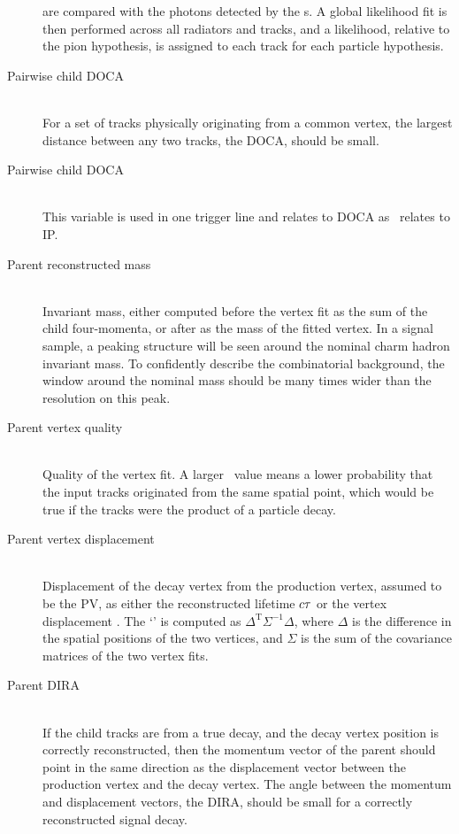 \begin{description}
    are compared with the photons detected by the {\rich}s.
    A global likelihood fit is then performed across all radiators and tracks, 
    and a likelihood, relative to the pion hypothesis, is assigned to each 
    track for each particle hypothesis.
  \item[Pairwise child \ac{DOCA}] \hfill \\
    For a set of tracks physically originating from a common vertex, the 
    largest distance between any two tracks, the \ac{DOCA}, should be small.
  \item[Pairwise child \ac{DOCA} \chisq] \hfill \\
    This variable is used in one trigger line and relates to \ac{DOCA} as 
    \ipchisq\ relates to \ac{IP}.
  \item[Parent reconstructed mass] \hfill \\
    Invariant mass, either computed before the vertex fit as the sum of the 
    child four-momenta, or after as the mass of the fitted vertex.
    In a signal sample, a peaking structure will be seen around the nominal 
    charm hadron invariant mass.
    To confidently describe the combinatorial background, the window around the 
    nominal mass should be many times wider than the resolution on this peak.
  \item[Parent vertex quality] \hfill \\
    Quality of the vertex fit.
    A larger \chisq\ value means a lower probability that the input tracks 
    originated from the same spatial point, which would be true if the tracks 
    were the product of a particle decay.
  \item[Parent vertex displacement] \hfill \\
    Displacement of the decay vertex from the production vertex, assumed to be 
    the \ac{PV}, as either the reconstructed lifetime $c\tau$ or the 
    vertex displacement \chisq.
    The `\chisq' is computed as $\Delta^{\text{T}}\Sigma^{-1}\Delta$, where 
    $\Delta$ is the difference in the spatial positions of the two vertices, and 
    $\Sigma$ is the sum of the covariance matrices of the two vertex fits.
  \item[Parent \ac{DIRA}] \hfill \\
    If the child tracks are from a true decay, and the decay vertex position is 
    correctly reconstructed, then the momentum vector of the parent should 
    point in the same direction as the displacement vector between the 
    production vertex and the decay vertex.
    The angle between the momentum and displacement vectors, the \ac{DIRA}, 
    should be small for a correctly reconstructed signal decay.
\end{description}

